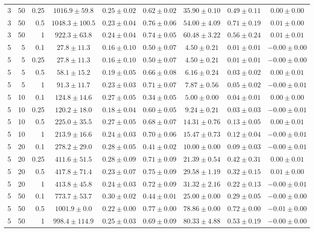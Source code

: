 \begin{table}[htbp]
\begin{tabular}{@{}rrrcccccc@{}}
3 & 50 & 0.25 & $1016.9 \pm 59.8$ & $0.25 \pm 0.02$ & $0.62 \pm 0.02$ & $35.90 \pm 0.10$ & $0.49 \pm 0.11$ & $0.00 \pm 0.00$ \\
3 & 50 & 0.5 & $1048.3 \pm 100.5$ & $0.23 \pm 0.04$ & $0.76 \pm 0.06$ & $54.00 \pm 4.09$ & $0.71 \pm 0.19$ & $0.01 \pm 0.00$ \\
3 & 50 & 1 & $922.3 \pm 63.8$ & $0.24 \pm 0.04$ & $0.74 \pm 0.05$ & $60.48 \pm 3.22$ & $0.56 \pm 0.24$ & $0.01 \pm 0.01$ \\
\midrule
5 & 5 & 0.1 & $27.8 \pm 11.3$ & $0.16 \pm 0.10$ & $0.50 \pm 0.07$ & $4.50 \pm 0.21$ & $0.01 \pm 0.01$ & $-0.00 \pm 0.00$ \\
5 & 5 & 0.25 & $27.8 \pm 11.3$ & $0.16 \pm 0.10$ & $0.50 \pm 0.07$ & $4.50 \pm 0.21$ & $0.01 \pm 0.01$ & $-0.00 \pm 0.00$ \\
5 & 5 & 0.5 & $58.1 \pm 15.2$ & $0.19 \pm 0.05$ & $0.66 \pm 0.08$ & $6.16 \pm 0.24$ & $0.03 \pm 0.02$ & $0.00 \pm 0.01$ \\
5 & 5 & 1 & $91.3 \pm 11.7$ & $0.23 \pm 0.03$ & $0.71 \pm 0.07$ & $7.87 \pm 0.56$ & $0.05 \pm 0.02$ & $-0.00 \pm 0.01$ \\
5 & 10 & 0.1 & $124.8 \pm 14.6$ & $0.27 \pm 0.05$ & $0.34 \pm 0.05$ & $5.00 \pm 0.00$ & $0.04 \pm 0.01$ & $0.00 \pm 0.00$ \\
5 & 10 & 0.25 & $120.2 \pm 18.0$ & $0.18 \pm 0.04$ & $0.60 \pm 0.05$ & $9.24 \pm 0.21$ & $0.03 \pm 0.03$ & $-0.00 \pm 0.01$ \\
5 & 10 & 0.5 & $225.0 \pm 35.5$ & $0.27 \pm 0.05$ & $0.68 \pm 0.07$ & $14.31 \pm 0.76$ & $0.13 \pm 0.05$ & $0.00 \pm 0.01$ \\
5 & 10 & 1 & $213.9 \pm 16.6$ & $0.24 \pm 0.03$ & $0.70 \pm 0.06$ & $15.47 \pm 0.73$ & $0.12 \pm 0.04$ & $-0.00 \pm 0.01$ \\
5 & 20 & 0.1 & $278.2 \pm 29.0$ & $0.28 \pm 0.05$ & $0.41 \pm 0.02$ & $10.00 \pm 0.00$ & $0.09 \pm 0.03$ & $-0.00 \pm 0.01$ \\
5 & 20 & 0.25 & $411.6 \pm 51.5$ & $0.28 \pm 0.09$ & $0.71 \pm 0.09$ & $21.39 \pm 0.54$ & $0.42 \pm 0.31$ & $0.00 \pm 0.01$ \\
5 & 20 & 0.5 & $417.8 \pm 71.4$ & $0.23 \pm 0.07$ & $0.75 \pm 0.09$ & $29.58 \pm 1.19$ & $0.32 \pm 0.15$ & $0.01 \pm 0.00$ \\
5 & 20 & 1 & $413.8 \pm 45.8$ & $0.24 \pm 0.03$ & $0.72 \pm 0.09$ & $31.32 \pm 2.16$ & $0.22 \pm 0.13$ & $-0.00 \pm 0.01$ \\
5 & 50 & 0.1 & $773.7 \pm 53.7$ & $0.30 \pm 0.02$ & $0.44 \pm 0.01$ & $25.00 \pm 0.00$ & $0.29 \pm 0.05$ & $-0.00 \pm 0.00$ \\
5 & 50 & 0.5 & $1001.9 \pm 0.0$ & $0.22 \pm 0.00$ & $0.77 \pm 0.00$ & $78.86 \pm 0.00$ & $0.72 \pm 0.00$ & $-0.01 \pm 0.00$ \\
5 & 50 & 1 & $998.4 \pm 114.9$ & $0.25 \pm 0.03$ & $0.69 \pm 0.09$ & $80.33 \pm 4.88$ & $0.53 \pm 0.19$ & $-0.00 \pm 0.00$ \\
\bottomrule
\end{tabular}
\end{table}
